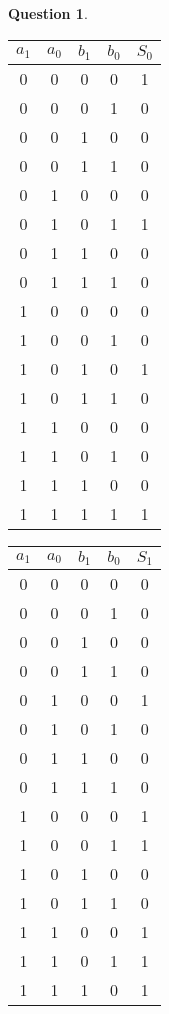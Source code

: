 \documentclass[11pt,a4paper]{article}
\theoremstyle{definition}%
\newtheorem{Q}{Question}[] %
\begin{document}
\begin{Q}
{	\begin{center}
		\begin{tabular}{|c|c|c|c|c|} \hline
		$a_1$ & $a_0$ & $b_1$ & $b_0$ & $S_0$ \\ \hline
		0 & 0 & 0 & 0 & 1 \\ \hline
		0 & 0 & 0 & 1 & 0 \\ \hline
		0 & 0 & 1 & 0 & 0 \\ \hline
		0 & 0 & 1 & 1 & 0 \\ \hline
		0 & 1 & 0 & 0 & 0 \\ \hline
		0 & 1 & 0 & 1 & 1 \\ \hline
		0 & 1 & 1 & 0 & 0 \\ \hline
		0 & 1 & 1 & 1 & 0 \\ \hline
		1 & 0 & 0 & 0 & 0 \\ \hline
		1 & 0 & 0 & 1 & 0 \\ \hline
		1 & 0 & 1 & 0 & 1 \\ \hline
		1 & 0 & 1 & 1 & 0 \\ \hline
		1 & 1 & 0 & 0 & 0 \\ \hline
		1 & 1 & 0 & 1 & 0 \\ \hline
		1 & 1 & 1 & 0 & 0 \\ \hline
		1 & 1 & 1 & 1 & 1 \\ \hline
		\end{tabular}
		\begin{tabular}{|c|c|c|c|c|} \hline
		$a_1$ & $a_0$ & $b_1$ & $b_0$ & $S_1$ \\ \hline
		0 & 0 & 0 & 0 & 0 \\ \hline
		0 & 0 & 0 & 1 & 0 \\ \hline
		0 & 0 & 1 & 0 & 0 \\ \hline
		0 & 0 & 1 & 1 & 0 \\ \hline
		0 & 1 & 0 & 0 & 1 \\ \hline
		0 & 1 & 0 & 1 & 0 \\ \hline
		0 & 1 & 1 & 0 & 0 \\ \hline
		0 & 1 & 1 & 1 & 0 \\ \hline
		1 & 0 & 0 & 0 & 1 \\ \hline
		1 & 0 & 0 & 1 & 1 \\ \hline
		1 & 0 & 1 & 0 & 0 \\ \hline
		1 & 0 & 1 & 1 & 0 \\ \hline
		1 & 1 & 0 & 0 & 1 \\ \hline
		1 & 1 & 0 & 1 & 1 \\ \hline
		1 & 1 & 1 & 0 & 1 \\ \hline

\end{tabular}
\end{center}}
\end{Q}
\end{document}
